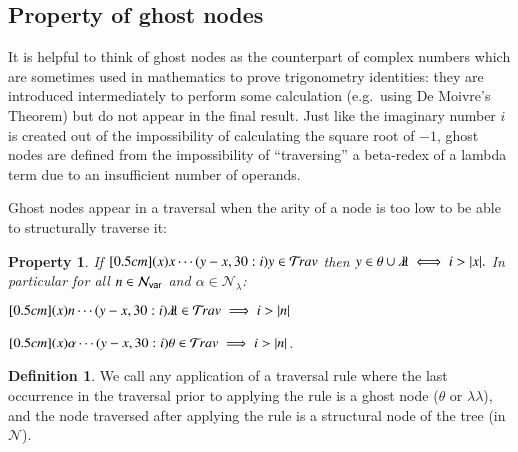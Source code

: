 \documentclass{elsarticle}
\theoremstyle{plain}
\newtheorem{property}[theorem]{Property}
\theoremstyle{definition}
\newtheorem{definition}{Definition}[section]
\theoremstyle{remark}
\newcommand\Nodes{\mathcal{N}}%
\newcommand\NodesVar{\Nodes_{\sf var}}%
\newcommand\NodesLmd{\Nodes_\lambda}%
\newcommand{\ghostlmd}{{\lambda\!\!\lambda}}
\newcommand{\ghostvar}{\theta}
\newcommand{\travulc}{\travset}
\begin{document}
\subsection{Property of ghost nodes}

It is helpful to think of ghost nodes as the counterpart of complex numbers which are sometimes used in mathematics
to prove trigonometry identities: they are introduced intermediately to perform some calculation (e.g.\ using De Moivre's Theorem) but do not appear in the final result. Just like the imaginary number $i$ is created out of the impossibility of calculating the square root of $-1$, ghost nodes are defined from the impossibility of ``traversing'' a beta-redex of a lambda term due to an insufficient number of operands.


Ghost nodes appear in a traversal when the arity of a node is too low to be able to structurally traverse it:
\begin{property}
\label{prop:ghost_justifier_arity}
If $\Pstr[0.5cm]{(x){x} \cdots (y-x,30:i){y}} \in \travulc$ then
$ y \in \ghostvar \union \ghostlmd \iff i > |x|.$
In particular for all $n\in\NodesVar$ and $\alpha\in\NodesLmd$:
\begin{enumerate*}[nosep,label=(\roman*)]
\item $\Pstr[0.5cm]{(x){n} \cdots (y-x,30:i){\ghostlmd}} \in \travulc \implies i > |n|$
\item $\Pstr[0.5cm]{(x){\alpha} \cdots (y-x,30:i){\ghostvar}} \in \travulc \implies i > |n|$.
\end{enumerate*}
\end{property}

\begin{definition}
We call  any application of a traversal rule where the last occurrence in the traversal prior to applying the rule is a ghost node ($\ghostvar$ or $\ghostlmd$), and the node traversed after applying the rule is a structural node of the tree (in $\Nodes$).
\end{definition}
\end{document}
